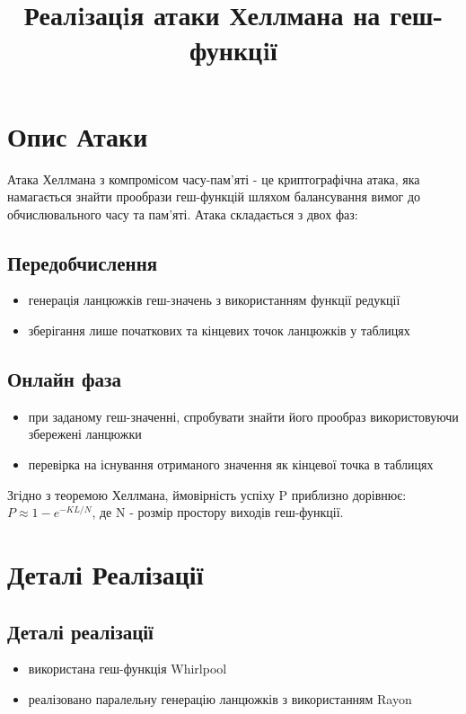 \documentclass[12pt]{article}
\title{\textbf{Реалiзацiя атаки Хеллмана на геш-функцiї}}
\author{}
\date{}
\begin{document}
\maketitle

\section{Опис Атаки}
Атака Хеллмана з компромісом часу-пам'яті - це криптографічна атака, яка намагається знайти прообрази геш-функцій шляхом балансування вимог до обчислювального часу та пам'яті. Атака складається з двох фаз:

\subsection{Передобчислення}
\begin{itemize}
  \item генерація ланцюжків геш-значень з використанням функції редукції
  \item зберігання лише початкових та кінцевих точок ланцюжків у таблицях
\end{itemize}

\subsection{Онлайн фаза}
\begin{itemize}
  \item при заданому геш-значенні, спробувати знайти його прообраз використовуючи збережені ланцюжки
  \item перевірка на існування отриманого значення як кінцевої точка в таблицях
\end{itemize}

Згідно з теоремою Хеллмана, ймовірність успіху P приблизно дорівнює:
$ P \approx 1 - e^{-KL/N} $, де N - розмір простору виходів геш-функції.

\section{Деталі Реалізації}

\subsection{Деталі реалізації}
\begin{itemize}
  \item використана геш-функція Whirlpool
  \item реалізовано паралельну генерацію ланцюжків з використанням Rayon
\end{itemize}
\end{document}
